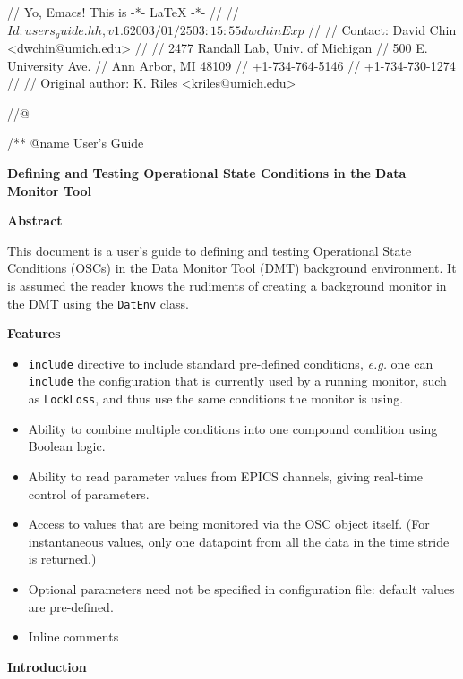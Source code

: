 // Yo, Emacs! This is -*- LaTeX -*-
//
// $Id: users_guide.hh,v 1.6 2003/01/25 03:15:55 dwchin Exp $
//
// Contact: David Chin <dwchin@umich.edu>
//
//         2477 Randall Lab, Univ. of Michigan
//         500 E. University Ave.
//         Ann Arbor, MI 48109
//         +1-734-764-5146
//         +1-734-730-1274
//
// Original author: K. Riles <kriles@umich.edu>



//@{

/** @name User's Guide
\begin{center}
  \textbf{{\Large Defining and Testing Operational State Conditions 
      in the Data Monitor Tool}}
\end{center}

\begin{center}
  \textbf{{\large Abstract}}
\end{center}

This document is a user's guide to defining and testing Operational
State Conditions (OSCs) in the Data Monitor Tool (DMT) background
environment.  It is assumed the reader knows the rudiments of creating
a background monitor in the DMT using the \texttt{DatEnv} class.

\begin{center}
  \textbf{{\large Features}}
\end{center}

\begin{itemize}
\item \texttt{include} directive to include standard pre-defined
  conditions, \textit{e.g.} one can \texttt{include} the configuration
  that is currently used by a running monitor, such as
  \texttt{LockLoss}, and thus use the same conditions the monitor is
  using.
\item Ability to combine multiple conditions into one compound
  condition using Boolean logic.
\item Ability to read parameter values from EPICS channels, giving
  real-time control of parameters.
\item Access to values that are being monitored via the OSC object
  itself. (For instantaneous values, only one datapoint from all the
  data in the time stride is returned.)
\item Optional parameters need not be specified in configuration
  file: default values are pre-defined.
\item Inline comments
\end{itemize}

\begin{center}
  \textbf{{\large Introduction}}
\end{center}

}
